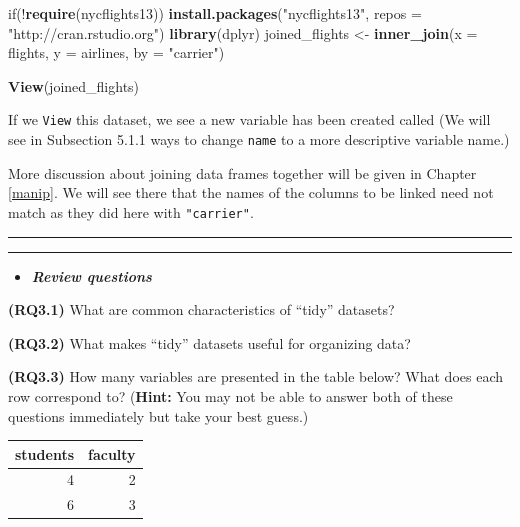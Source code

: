 \documentclass[]{tufte-book}
\newenvironment{Shaded}{\begin{snugshade}}{\end{snugshade}}
\newcommand{\KeywordTok}[1]{\textcolor[rgb]{0.13,0.29,0.53}{\textbf{{#1}}}}
\newcommand{\DataTypeTok}[1]{\textcolor[rgb]{0.13,0.29,0.53}{{#1}}}
\newcommand{\StringTok}[1]{\textcolor[rgb]{0.31,0.60,0.02}{{#1}}}
\newcommand{\NormalTok}[1]{{#1}}
\let\oldrule=\rule
\renewcommand{\rule}[1]{\oldrule{\linewidth}}
\newenvironment{rmdblock}[1]
  {\begin{shaded*}
  \begin{itemize}
  \renewcommand{\labelitemi}{
    \raisebox{-.7\height}[0pt][0pt]{
    }
  }
  \item
  }
  {
  \end{itemize}
  \end{shaded*}
  }
\newenvironment{review}
  {\begin{rmdblock}{warning}}
  {\end{rmdblock}}
\begin{document}
\begin{Shaded}
\begin{Highlighting}[]
\NormalTok{if(!}\KeywordTok{require}\NormalTok{(nycflights13))}
  \KeywordTok{install.packages}\NormalTok{(}\StringTok{"nycflights13"}\NormalTok{, }\DataTypeTok{repos =} \StringTok{"http://cran.rstudio.org"}\NormalTok{)}
\KeywordTok{library}\NormalTok{(dplyr)}
\NormalTok{joined_flights <-}\StringTok{ }\KeywordTok{inner_join}\NormalTok{(}\DataTypeTok{x =} \NormalTok{flights, }\DataTypeTok{y =} \NormalTok{airlines, }\DataTypeTok{by =} \StringTok{"carrier"}\NormalTok{)}
\end{Highlighting}
\end{Shaded}

\begin{Shaded}
\begin{Highlighting}[]
\KeywordTok{View}\NormalTok{(joined_flights)}
\end{Highlighting}
\end{Shaded}

If we \texttt{View} this dataset, we see a new variable has been created
called (We will see in Subsection 5.1.1 ways to change \texttt{name} to
a more descriptive variable name.)

More discussion about joining data frames together will be given in
Chapter \ref{manip}. We will see there that the names of the columns to
be linked need not match as they did here with \texttt{"carrier"}.

\begin{center}\rule{0.5\linewidth}{\linethickness}\end{center}

\begin{center}\rule{0.5\linewidth}{\linethickness}\end{center}

\begin{review}
\textbf{\emph{Review questions}}
\end{review}

\textbf{(RQ3.1)} What are common characteristics of ``tidy'' datasets?

\textbf{(RQ3.2)} What makes ``tidy'' datasets useful for organizing
data?

\textbf{(RQ3.3)} How many variables are presented in the table below?
What does each row correspond to? (\textbf{Hint:} You may not be able to
answer both of these questions immediately but take your best guess.)

\begin{tabular}{r|r}
\hline
students & faculty\\
\hline
4 & 2\\
\hline
6 & 3\\
\hline
\end{tabular}
\end{document}
